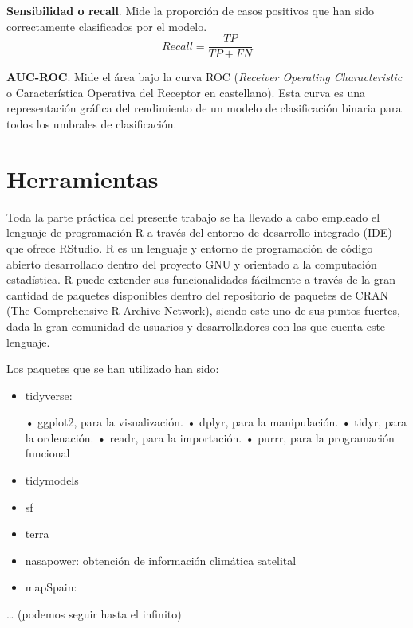 \documentclass[12pt,a4paper,]{book}
\def\ifprincipal{} %
\numberwithin{dummy}{section}
\theoremstyle{ocrenumbox}
\theoremstyle{blacknumex}
\theoremstyle{blacknumbox}
\theoremstyle{ocrenum}
\theoremstyle{ocrenum}
\begin{document}
\textbf{Sensibilidad o recall}. Mide la proporción de casos positivos
que han sido correctamente clasificados por el modelo.
\[ Recall = \frac{TP}{TP + FN}\]

\textbf{AUC-ROC}. Mide el área bajo la curva ROC (\emph{Receiver
Operating Characteristic} o Característica Operativa del Receptor en
castellano). Esta curva es una representación gráfica del rendimiento de
un modelo de clasificación binaria para todos los umbrales de
clasificación.

\hypertarget{herramientas}{%
\section{Herramientas}\label{herramientas}}

Toda la parte práctica del presente trabajo se ha llevado a cabo
empleado el lenguaje de programación R a través del entorno de
desarrollo integrado (IDE) que ofrece RStudio. R es un lenguaje y
entorno de programación de código abierto desarrollado dentro del
proyecto GNU y orientado a la computación estadística. R puede extender
sus funcionalidades fácilmente a través de la gran cantidad de paquetes
disponibles dentro del repositorio de paquetes de CRAN (The
Comprehensive R Archive Network), siendo este uno de sus puntos fuertes,
dada la gran comunidad de usuarios y desarrolladores con las que cuenta
este lenguaje.

Los paquetes que se han utilizado han sido:

\begin{itemize}
\item
  tidyverse:

  • ggplot2, para la visualización. • dplyr, para la manipulación. •
  tidyr, para la ordenación. • readr, para la importación. • purrr, para
  la programación funcional
\item
  tidymodels
\item
  sf
\item
  terra
\item
  nasapower: obtención de información climática satelital
\item
  mapSpain:
\end{itemize}

\ldots{} (podemos seguir hasta el infinito)

\FloatBarrier

\ifdefined\ifprincipal
\else
\setlength{\parindent}{1em}
\pagestyle{fancy}
\setcounter{tocdepth}{4}
\tableofcontents

\fi
\end{document}
